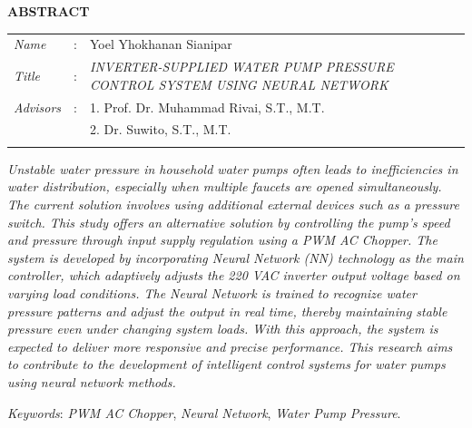 \begin{center}
  \large\textbf{ABSTRACT}
\end{center}


\vspace{2ex}

\begingroup
\setlength{\tabcolsep}{0pt}

\noindent
\begin{tabularx}{\textwidth}{l >{\centering}m{3em} X}
  \emph{Name}     & : & Yoel Yhokhanan Sianipar         \\

  \emph{Title}    & : & \emph{INVERTER-SUPPLIED WATER PUMP PRESSURE CONTROL SYSTEM USING NEURAL NETWORK}   \\

  \emph{Advisors} & : & 1. Prof. Dr. Muhammad Rivai, S.T., M.T.   \\
                  &   & 2. Dr. Suwito, S.T., M.T. \\
\vspace{1ex}
\end{tabularx}
\endgroup

\emph{Unstable water pressure in household water pumps often leads to inefficiencies in water distribution, 
especially when multiple faucets are opened simultaneously. The current solution involves using additional 
external devices such as a pressure switch. This study offers an alternative solution by controlling the pump’s 
speed and pressure through input supply regulation using a PWM AC Chopper. The system is developed by incorporating 
Neural Network (NN) technology as the main controller, which adaptively adjusts the 220 VAC inverter output voltage 
based on varying load conditions. 
The Neural Network is trained to recognize water pressure patterns and adjust the output in real time, thereby 
maintaining stable pressure even under changing system loads. With this approach, the system is expected to deliver more responsive 
and precise performance. This research aims to contribute to the development of intelligent control systems for water pumps 
using neural network methods.}

\emph{Keywords}: \emph{PWM AC Chopper}, \emph{Neural Network}, \emph{Water Pump Pressure}.

